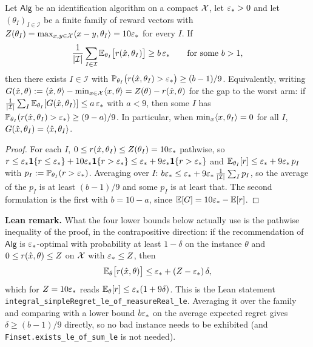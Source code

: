 \begin{lemma}\label{lem:fail_prob_from_expected_value}
\leanok
{}
Let $\mathsf{Alg}$ be an identification algorithm on a compact $\mathcal{X}$, let $\varepsilon_* > 0$ and let
$(\theta_I)_{I\in\mathcal I}$ be a finite family of reward vectors with
$Z(\theta_I) = \max_{x,y\in\mathcal{X}}\langle x-y, \theta_I \rangle = 10\varepsilon_*$ for every $I$. If
\[
  \frac{1}{\lvert \mathcal I \rvert}\sum_{I\in\mathcal I}\mathbb{E}_{\theta_I}\big[r(\hat{x},\theta_I)\big] \ge b\,\varepsilon_*
  \qquad\text{for some } b > 1,
\]
then there exists $I \in \mathcal I$ with
$\mathbb{P}_{\theta_I}\big(r(\hat{x},\theta_I) > \varepsilon_*\big) \ge (b-1)/9$. Equivalently, writing
$G(\hat{x},\theta) := \langle \hat{x}, \theta \rangle - \min_{x\in\mathcal{X}}\langle x, \theta \rangle = Z(\theta) - r(\hat{x},\theta)$
for the gap to the worst arm: if
$\frac{1}{\lvert \mathcal I \rvert}\sum_I\mathbb{E}_{\theta_I}[G(\hat{x},\theta_I)] \le a\,\varepsilon_*$ with $a < 9$,
then some $I$ has $\mathbb{P}_{\theta_I}(r(\hat{x},\theta_I) > \varepsilon_*) \ge (9-a)/9$. In particular,
when $\min_x\langle x, \theta_I \rangle = 0$ for all $I$, $G(\hat{x},\theta_I) = \langle \hat{x}, \theta_I \rangle$.
\end{lemma}

\begin{proof}
For each $I$, $0 \le r(\hat{x},\theta_I) \le Z(\theta_I) = 10\varepsilon_*$ pathwise, so
$r \le \varepsilon_*\mathbf{1}\{r \le \varepsilon_*\} + 10\varepsilon_*\mathbf{1}\{r > \varepsilon_*\} \le \varepsilon_* + 9\varepsilon_*\mathbf{1}\{r > \varepsilon_*\}$
and $\mathbb{E}_{\theta_I}[r] \le \varepsilon_* + 9\varepsilon_*\,p_I$ with $p_I := \mathbb{P}_{\theta_I}(r > \varepsilon_*)$.
Averaging over $I$: $b\varepsilon_* \le \varepsilon_* + 9\varepsilon_*\,\frac{1}{\lvert \mathcal I \rvert}\sum_Ip_I$, so the
average of the $p_I$ is at least $(b-1)/9$ and some $p_I$ is at least that. The second
formulation is the first with $b = 10 - a$, since $\mathbb{E}[G] = 10\varepsilon_* - \mathbb{E}[r]$.
\end{proof}

\textbf{Lean remark.} What the four lower bounds below actually use is the pathwise
inequality of the proof, in the contrapositive direction: if the recommendation of
$\mathsf{Alg}$ is $\varepsilon_*$-optimal with probability at least $1-\delta$ on the instance
$\theta$ and $0 \le r(\hat{x},\theta) \le Z$ on $\mathcal{X}$ with $\varepsilon_* \le Z$, then
\[
  \mathbb{E}_\theta\big[r(\hat{x},\theta)\big] \le \varepsilon_* + (Z - \varepsilon_*)\,\delta ,
\]
which for $Z = 10\varepsilon_*$ reads $\mathbb{E}_\theta[r] \le \varepsilon_*(1 + 9\delta)$. This is the Lean
statement \texttt{integral\_simpleRegret\_le\_of\_measureReal\_le}. Averaging it over the
family and comparing with a lower bound $b\varepsilon_*$ on the average expected regret gives
$\delta \ge (b-1)/9$ directly, so no bad instance needs to be exhibited (and
\texttt{Finset.exists\_le\_of\_sum\_le} is not needed).

